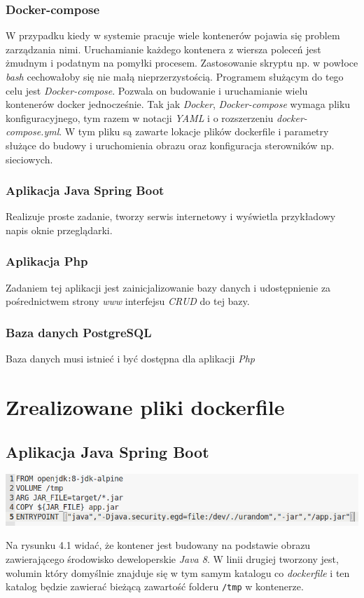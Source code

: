 \documentclass[polish, a4paper, 12pt, oneside]{book}
\begin{document}
	\subsubsection{Docker-compose}
	W przypadku kiedy w systemie pracuje wiele kontenerów pojawia się problem zarządzania nimi. Uruchamianie każdego kontenera z wiersza poleceń jest żmudnym i podatnym na pomyłki procesem. Zastosowanie skryptu np. w powłoce \textit{bash} cechowałoby się nie małą nieprzerzystością. Programem służącym do tego celu jest \textit{Docker-compose}. Pozwala on budowanie i uruchamianie wielu kontenerów docker jednocześnie. Tak jak \textit{Docker}\cite{docker}, \textit{Docker-compose}\cite{dockercompose} wymaga pliku konfiguracyjnego, tym razem w notacji \textit{YAML} i o rozszerzeniu \textit{docker-compose.yml}. W tym pliku są zawarte lokacje plików dockerfile i parametry służące do budowy i uruchomienia obrazu oraz konfiguracja sterowników np. sieciowych. 
	\subsubsection{Aplikacja Java Spring Boot}
	Realizuje proste zadanie, tworzy serwis internetowy i wyświetla przykładowy napis oknie przeglądarki.
	\subsubsection{Aplikacja Php}
	Zadaniem tej aplikacji jest zainicjalizowanie bazy danych i udostępnienie za pośrednictwem strony \textit{www} interfejsu \textit{CRUD} do tej bazy.
	\subsubsection{Baza danych PostgreSQL}
	Baza danych musi istnieć i być dostępna dla aplikacji \textit{Php}
	\section{Zrealizowane pliki dockerfile}
	\subsection{Aplikacja Java Spring Boot}
	\begin{center}
		\includegraphics[width=160mm]{dockerfile_java.png}
	\end{center}
	Na rysunku 4.1 widać, że kontener jest budowany na podstawie obrazu zawierającego środowisko deweloperskie \textit{Java 8}\cite{java}. W linii drugiej tworzony jest, wolumin który domyślnie znajduje się w tym samym katalogu co \textit{dockerfile} i ten katalog będzie zawierać bieżącą zawartość folderu \texttt{/tmp} w kontenerze.
	
\end{document}
